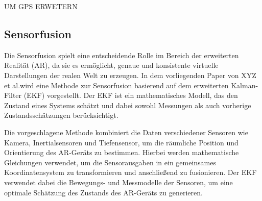 UM GPS ERWETERN

\subsection{Sensorfusion}
Die Sensorfusion spielt eine entscheidende Rolle im Bereich der erweiterten
Realität (AR), da sie es ermöglicht, genaue und konsistente virtuelle
Darstellungen der realen Welt zu erzeugen. In dem vorliegenden Paper von XYZ et
al.wird eine Methode zur Sensorfusion basierend auf dem erweiterten
Kalman-Filter (EKF) vorgestellt. Der EKF ist ein mathematisches Modell, das den
Zustand eines Systems schätzt und dabei sowohl Messungen als auch vorherige
Zustandsschätzungen berücksichtigt.

Die vorgeschlagene Methode kombiniert die Daten verschiedener Sensoren wie
Kamera, Inertialsensoren und Tiefensensor, um die räumliche Position und
Orientierung des AR-Geräts zu bestimmen. Hierbei werden mathematische
Gleichungen verwendet, um die Sensorausgaben in ein gemeinsames
Koordinatensystem zu transformieren und anschließend zu fusionieren. Der EKF
verwendet dabei die Bewegungs- und Messmodelle der Sensoren, um eine optimale
Schätzung des Zustands des AR-Geräts zu generieren.

